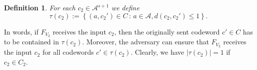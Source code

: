 \documentclass[11pt]{article}
\newcommand{\cA}{\mathcal{A}}
\newcommand{\cN}{\mathcal{N}}
\newtheorem{lemma}[theorem]{Lemma}
\newtheorem{definition}[theorem]{Definition}
\begin{document}



\begin{definition}
  \label{def_tau}
  For each $c_2\in\cA^{s+1}$ we define
  \begin{equation}
    \tau(c_2):=\left\{\left(a,c_2'\right)\in C\,:\,a\in\cA, d(c_2,c_2')\le 1\right\}.
  \end{equation}
\end{definition}
In words, if $F_{V_2}$ receives the input $c_2$, then the originally sent codeword $c'\in C$ has to be contained in $\tau(c_2)$. Moreover, the 
adversary can ensure that $F_{V_2}$ receives the input $c_2$ for all codewords $c'\in\tau(c_2)$. Clearly, we have $|\tau(c_2)|=1$ if $c_2\in C_2$.  
\end{document}
